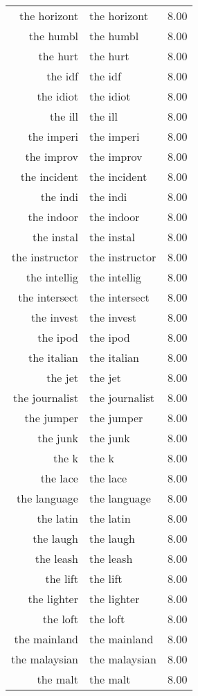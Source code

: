 \begin{table}[ht]
\begin{tabular}{rlr}
  the horizont & the horizont & 8.00 \\ 
  the humbl & the humbl & 8.00 \\ 
  the hurt & the hurt & 8.00 \\ 
  the idf & the idf & 8.00 \\ 
  the idiot & the idiot & 8.00 \\ 
  the ill & the ill & 8.00 \\ 
  the imperi & the imperi & 8.00 \\ 
  the improv & the improv & 8.00 \\ 
  the incident & the incident & 8.00 \\ 
  the indi & the indi & 8.00 \\ 
  the indoor & the indoor & 8.00 \\ 
  the instal & the instal & 8.00 \\ 
  the instructor & the instructor & 8.00 \\ 
  the intellig & the intellig & 8.00 \\ 
  the intersect & the intersect & 8.00 \\ 
  the invest & the invest & 8.00 \\ 
  the ipod & the ipod & 8.00 \\ 
  the italian & the italian & 8.00 \\ 
  the jet & the jet & 8.00 \\ 
  the journalist & the journalist & 8.00 \\ 
  the jumper & the jumper & 8.00 \\ 
  the junk & the junk & 8.00 \\ 
  the k & the k & 8.00 \\ 
  the lace & the lace & 8.00 \\ 
  the language & the language & 8.00 \\ 
  the latin & the latin & 8.00 \\ 
  the laugh & the laugh & 8.00 \\ 
  the leash & the leash & 8.00 \\ 
  the lift & the lift & 8.00 \\ 
  the lighter & the lighter & 8.00 \\ 
  the loft & the loft & 8.00 \\ 
  the mainland & the mainland & 8.00 \\ 
  the malaysian & the malaysian & 8.00 \\ 
  the malt & the malt & 8.00 \\ 

\end{tabular}
\end{table}
